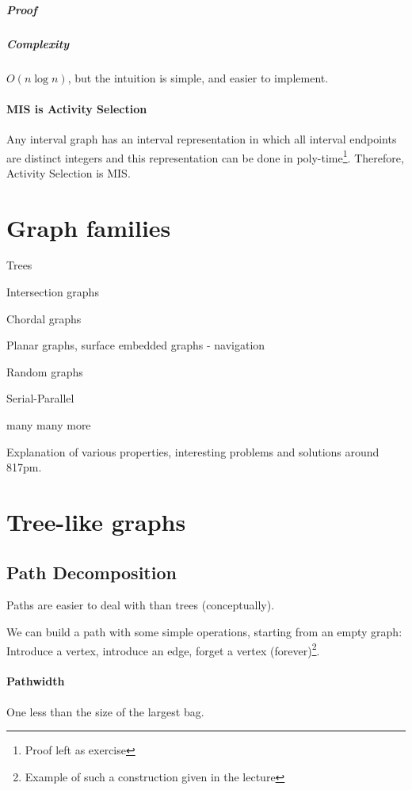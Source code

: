\documentclass[a4paper]{article}
\newenvironment{enumerate*}%
  {\begin{enumerate}%
    \setlength{\itemsep}{0.5pt}%
    \setlength{\parsep}{0pt}%
    \setlength{\parskip}{0pt}}%
  {\end{enumerate}}
\begin{document}
\subparagraph{Proof}

\subparagraph{Complexity}
$O(n\log n)$, but the intuition is simple, and easier to implement.

\paragraph{MIS is Activity Selection}
Any interval graph has an interval representation in which all interval endpoints are distinct integers and this representation can be done in poly-time\footnote{Proof left as exercise}. Therefore, Activity Selection is MIS.

\section{Graph families}
\begin{enumerate*}
  \item Trees
  \item Intersection graphs
  \item Chordal graphs
  \item Planar graphs, surface embedded graphs - navigation
  \item Random graphs
  \item Serial-Parallel
  \item many many more
\end{enumerate*}

Explanation of various properties, interesting problems and solutions around 817pm.

\section{Tree-like graphs}

\subsection{Path Decomposition}
Paths are easier to deal with than trees (conceptually).

We can build a path with some simple operations, starting from an empty graph: Introduce a vertex, introduce an edge, forget a vertex (forever)\footnote{Example of such a construction given in the lecture}.

\paragraph{Pathwidth}
One less than the size of the largest bag.
\end{document}
